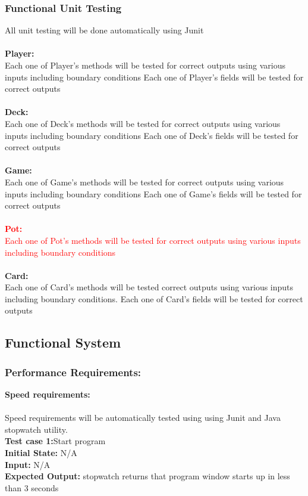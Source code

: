 \documentclass[12pt]{article}
\begin{document}
	
	\subsubsection{Functional Unit Testing} 
    All unit testing will be done automatically using Junit\\
    \\
    \textbf{Player: } \\
    \indent \indent Each one of Player’s methods will be tested for correct outputs
using various inputs including boundary conditions
        Each one of Player’s fields will be tested for correct outputs\\
    \\
    \textbf{Deck:} \\
	\indent \indent Each one of Deck’s methods will be tested for correct outputs
using various inputs including boundary conditions
        Each one of Deck’s fields will be tested for correct outputs\\
    \\
    \textbf{Game:} \\
	\indent \indent Each one of Game’s methods will be tested for correct outputs
using various inputs including boundary conditions
        Each one of Game’s fields will be tested for correct outputs\\
	\\
	\textcolor{red}{\textbf{Pot:} \\
	\indent \indent Each one of Pot's methods will be tested for correct outputs using various inputs including boundary conditions}\\
	\\
    \textbf{Card:}\\
	\indent \indent Each one of Card’s methods will be tested correct outputs 
using various inputs including boundary conditions. Each one of Card’s fields will be tested for correct outputs

	\subsection{Functional System}
	\subsubsection{Performance Requirements:}
	\textbf{Speed requirements:}\\
	\\
    Speed requirements will be automatically tested using using Junit and Java stopwatch utility.
	\\
	\textbf{Test case 1:}Start program\\
	\textbf{Initial State:} N/A\\
	\textbf{Input:} N/A\\
	\textbf{Expected Output:} stopwatch returns that program window starts up in less than 3 seconds\\
\end{document}
